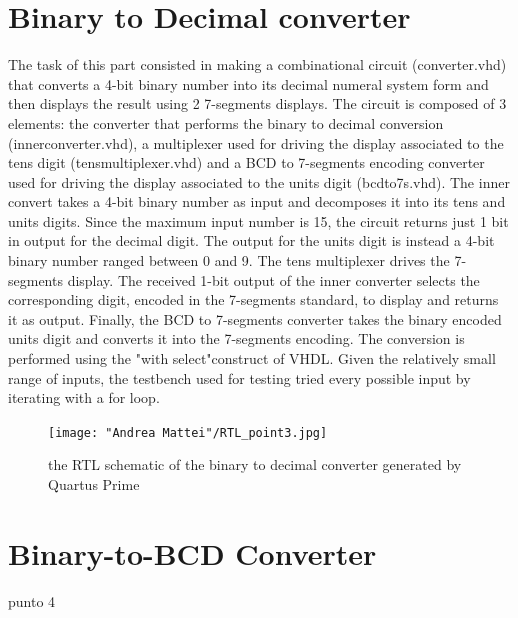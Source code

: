 \documentclass[12pt]{article}
\begin{document}
\section{ Binary to Decimal converter}
The task of this part consisted in making a combinational circuit (converter.vhd) that converts a 4-bit binary number into its decimal numeral system form and then displays the result using 2 7-segments displays. The circuit is composed of 3 elements: the converter that performs the binary to decimal conversion (inner\textunderscore converter.vhd), a multiplexer used for driving the display associated to the tens digit (tens\textunderscore multiplexer.vhd) and a BCD to 7-segments encoding converter used for driving the display associated to the units digit (bcd\textunderscore to\textunderscore 7s.vhd). \newline
The inner convert takes a 4-bit binary number as input and decomposes it into its tens and units digits. Since the maximum input number is 15, the circuit returns just 1 bit in output for the decimal digit. The output for the units digit is instead a 4-bit binary number ranged between 0 and 9. \newline
The tens multiplexer drives the 7-segments display. The received 1-bit output of the inner converter selects the corresponding digit, encoded in the 7-segments standard, to display and returns it as output. \newline
Finally, the BCD to 7-segments converter takes the binary encoded units digit and converts it into the 7-segments encoding. The conversion is performed using the "with select"construct of VHDL. \newline
Given the relatively small range of inputs, the testbench used for testing tried every possible input by iterating with a for loop.
\begin{figure}[h]
	\centering
	\texttt{[image: "Andrea Mattei"/RTL\_point3.jpg]}
	\caption{the RTL schematic of the binary to decimal converter generated by Quartus Prime}
\end{figure}
\section{ Binary-to-BCD Converter}
punto 4
\end{document}
